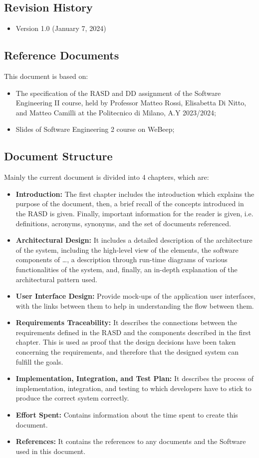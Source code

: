 \documentclass{article}
\begin{document}
\subsection{Revision History}
\begin{itemize}
    \item Version 1.0 (January 7, 2024)
\end{itemize}


\subsection{Reference Documents}
This document is based on:
\begin{itemize}
    \item The specification of the RASD and DD assignment of the Software Engineering II course, held by Professor Matteo Rossi, Elisabetta Di Nitto, and Matteo Camilli at the Politecnico di Milano, A.Y 2023/2024; 
    \item Slides of Software Engineering 2 course on WeBeep;
\end{itemize}


\subsection{Document Structure}
Mainly the current document is divided into 4 chapters, which are:
\begin{itemize}
    \item \textbf{Introduction:} The first chapter includes the introduction which explains the purpose of the document, then, a brief recall of the concepts introduced in the RASD is given. Finally, important information for the reader is given, i.e. definitions, acronyms, synonyms, and the set of documents referenced. 
    \item \textbf{Architectural Design:} It includes a detailed description of the architecture of the system, including the high-level view of the elements, the software components of …, a description through run-time diagrams of various functionalities of the system, and, finally, an in-depth explanation of the architectural pattern used.
    \item \textbf{User Interface Design:} Provide mock-ups of the application user interfaces, with the links between them to help in understanding the flow between them. 
    \item \textbf{Requirements Traceability:} It describes the connections between the requirements defined in the RASD and the components described in the first chapter. This is used as proof that the design decisions have been taken concerning the requirements, and therefore that the designed system can fulfill the goals. 
    \item \textbf{Implementation, Integration, and Test Plan:} It describes the process of implementation, integration, and testing to which developers have to stick to produce the correct system correctly. 
    \item \textbf{Effort Spent:} Contains information about the time spent to create this document. 
    \item \textbf{References:} It contains the references to any documents and the Software used in this document. 
\end{itemize}
\end{document}
